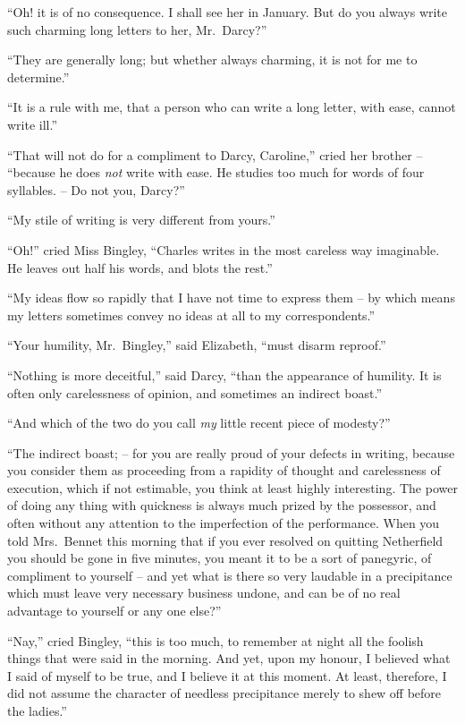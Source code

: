 “Oh! it is of no consequence. I shall see her in January.
But do you always write such charming long letters to
her, Mr.\ Darcy?”

“They are generally long; but whether always
charming, it is not for me to determine.”

“It is a rule with me, that a person who can write
a long letter, with ease, cannot write ill.”

“That will not do for a compliment to Darcy, Caroline,”
cried her brother -- “because he does \textit{not} write with ease.
He studies too much for words of four syllables. -- Do not
you, Darcy?”

“My stile of writing is very different from yours.”

“Oh!” cried Miss Bingley, “Charles writes in the most
careless way imaginable. He leaves out half his words,
and blots the rest.”

“My ideas flow so rapidly that I have not time to
express them -- by which means my letters sometimes
convey no ideas at all to my correspondents.”

“Your humility, Mr.\ Bingley,” said Elizabeth, “must
disarm reproof.”

“Nothing is more deceitful,” said Darcy, “than the
appearance of humility. It is often only carelessness of
opinion, and sometimes an indirect boast.”

“And which of the two do you call \textit{my} little recent
piece of modesty?”

“The indirect boast; -- for you are really proud of your
defects in writing, because you consider them as proceeding
from a rapidity of thought and carelessness of
execution, which if not estimable, you think at least
highly interesting. The power of doing any thing with
quickness is always much prized by the possessor, and
often without any attention to the imperfection of the
performance. When you told Mrs.\ Bennet this morning
that if you ever resolved on quitting Netherfield you
should be gone in five minutes, you meant it to be a sort
of panegyric, of compliment to yourself -- and yet what
is there so very laudable in a precipitance which must
leave very necessary business undone, and can be of no real
advantage to yourself or any one else?”

“Nay,” cried Bingley, “this is too much, to remember
at night all the foolish things that were said in the morning.
And yet, upon my honour, I believed what I said of myself
to be true, and I believe it at this moment. At least,
therefore, I did not assume the character of needless
precipitance merely to shew off before the ladies.”

